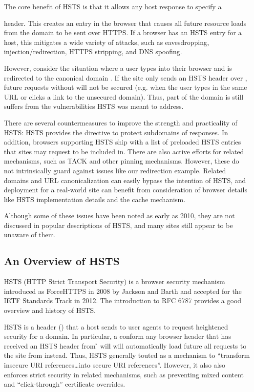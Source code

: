 \documentclass{acm_proc_article-sp}
\begin{document}
The core benefit of HSTS is that it allows any host response to specify a { header. This creates an entry in the browser that causes all future resource loads from the domain to be sent over HTTPS. If a browser has an HSTS entry for a host, this mitigates a wide variety of attacks, such as eavesdropping, injection/redirection, HTTPS stripping, and DNS spoofing.

However, consider the situation where a user types {\site{\genericsite}} into their browser and is redirected to the canonical domain {\sw}. If the site only sends an HSTS header over {\sw}, future requests without  will not be secured (e.g. when the user types in the same URL or clicks a link to the unsecured domain). Thus, part of the domain is still suffers from the vulnerabilities HSTS was meant to address.

There are several countermeasures to improve the strength and practicality of HSTS: HSTS provides the {\iSD} directive to protect subdomains of responses. In addition, browsers supporting HSTS ship with a list of preloaded HSTS entries that sites may request to be included in. There are also active efforts for related mechanisms, such as TACK\cite{tack} and other pinning mechanisms. However, these do not intrinsically guard against issues like our redirection example. Related domains and URL canonicalization can easily bypass the intention of HSTS, and deployment for a real-world site can benefit from consideration of browser details like HSTS implementation details and the cache mechanism.

Although some of these issues have been noted as early as 2010\cite{coderrr-blog}, they are not discussed in popular descriptions of HSTS, and many sites still appear to be unaware of them.

\subsection{An Overview of HSTS}

HSTS (HTTP Strict Transport Security) is a browser security mechanism introduced as ForceHTTPS in 2008 by Jackson and Barth\cite{forcehttps} and accepted for the IETF Standards Track in 2012\cite{rfc}. The introduction to RFC 6787 provides a good overview and history of HSTS.

HSTS is a header ({}) that a host sends to user agents to request heightened security for a domain. In particular, a conform any browser header that has received an HSTS header from {\h} will will automatically load future all requests to the site from {\s} instead. Thus, HSTS generally touted as a mechanism to ``transform insecure URI references\ldots into secure URI references''. However, it also also enforces strict security in related mechanisms, such as preventing mixed content and ``click-through'' certificate overrides\cite{rfc}.

}
\end{document}
